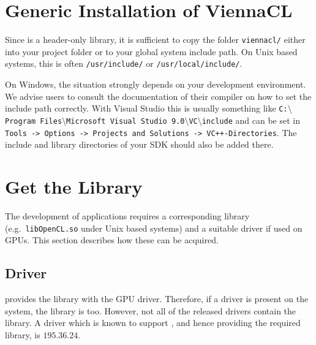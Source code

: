 \section{Generic Installation of ViennaCL} \label{sec:viennacl-installation}
Since {\ViennaCL} is a header-only library, it is sufficient to copy the folder
\lstinline|viennacl/| either into your project folder or to your global system
include path. On Unix based systems, this is often \lstinline|/usr/include/| or
\lstinline|/usr/local/include/|.

On Windows, the situation strongly depends on your development environment. We advise users
to consult the documentation of their compiler on how to set the include
path correctly. With Visual Studio this is usually something like \texttt{C:$\setminus$Program Files$\setminus$Microsoft Visual Studio 9.0$\setminus$VC$\setminus$include}
and can be set in \texttt{Tools -> Options -> Projects and Solutions -> VC++-\-Directories}. The include and library directories of your {\OpenCL} SDK should also be added there.



\section{Get the {\OpenCL} Library}
\label{opencllibs}
The development of {\OpenCL} applications requires a corresponding library
(e.g.~\texttt{libOpenCL.so} under Unix based systems) and a suitable driver if
used on GPUs. This section describes how these can be acquired.


\subsection{\NVIDIA Driver}
\NVIDIA provides the {\OpenCL} library with the GPU driver. Therefore, if a 
\NVIDIA driver is present on the system, the library is too. However, 
not all of the released drivers contain the {\OpenCL} library. 
A driver which is known to support {\OpenCL}, and hence providing the required
library, is $195.36.24$. 

